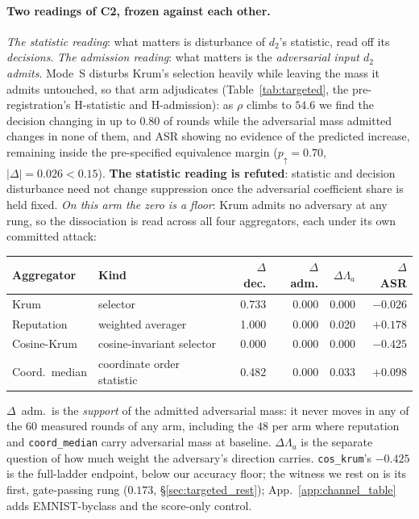 \documentclass{article}
\begin{document}
\paragraph{Two readings of C2, frozen against each other.} \emph{The statistic reading}: what matters is disturbance of $d_2$'s statistic, read off its \emph{decisions}. \emph{The admission reading}: what matters is the \emph{adversarial input $d_2$ admits}. Mode~S disturbs Krum's selection heavily while leaving the mass it admits untouched, so that arm adjudicates (Table~\ref{tab:targeted}, the pre-registration's H-statistic and H-admission): as $\rho$ climbs to $54.6$ we find the decision changing in up to $0.80$ of rounds while the adversarial mass admitted changes in none of them, and ASR showing no evidence of the predicted increase, remaining inside the pre-specified equivalence margin ($p_{\uparrow}{=}0.70$, $|\Delta|{=}0.026<0.15$). \textbf{The statistic reading is refuted}: statistic and decision disturbance need not change suppression once the adversarial coefficient share is held fixed. \emph{On this arm the zero is a floor}: Krum admits no adversary at any rung, so the dissociation is read across all four aggregators, each under its own committed attack:

\begin{center}\small\vspace{-7pt}\setlength{\tabcolsep}{5pt}
\begin{tabular}{@{}llrrrr@{}}
\toprule
Aggregator & Kind & $\Delta$ dec. & $\Delta$ adm. & $\Delta \Lambda_a$ & $\Delta$ ASR \\
\midrule
Krum & selector & 0.733 & 0.000 & 0.000 & $-0.026$ \\
Reputation & weighted averager & 1.000 & 0.000 & 0.020 & $+0.178$ \\
Cosine-Krum & cosine-invariant selector & 0.000 & 0.000 & 0.000 & $-0.425$ \\
Coord.\ median & coordinate order statistic & 0.482 & 0.000 & 0.033 & $+0.098$ \\
\bottomrule
\end{tabular}
\vspace{-5pt}\end{center}

\noindent $\Delta$~adm.\ is the \emph{support} of the admitted adversarial mass: it never moves in any of the $60$ measured rounds of any arm, including the $48$ per arm where reputation and \texttt{coord\_median} carry adversarial mass at baseline. $\Delta\Lambda_a$ is the separate question of how much weight the adversary's direction carries. \texttt{cos\_krum}'s $-0.425$ is the full-ladder endpoint, below our accuracy floor; the witness we rest on is its first, gate-passing rung ($0.173$, \S\ref{sec:targeted_rest}); App.~\ref{app:channel_table} adds EMNIST-byclass and the score-only control.
\end{document}

